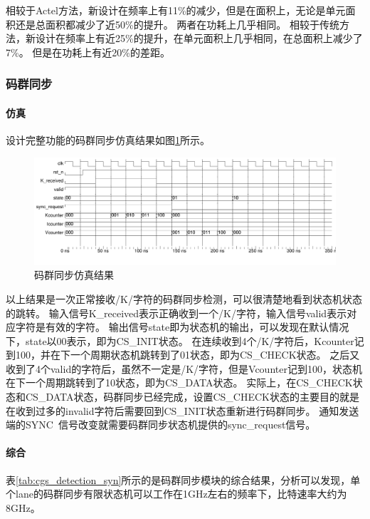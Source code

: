 \documentclass[UTF8]{ctexart}
\begin{document}
相较于Actel方法，新设计在频率上有11\%的减少，但是在面积上，无论是单元面积还是总面积都减少了近50\%的提升。
两者在功耗上几乎相同。
相较于传统方法，新设计在频率上有近25\%的提升，在单元面积上几乎相同，在总面积上减少了7\%。
但是在功耗上有近20\%的差距。

\subsubsection{码群同步}

\paragraph{仿真}

设计完整功能的码群同步仿真结果如图\ref{fig:cgs_detection_wave}所示。

\begin{figure}[H]
	\centering
	\includegraphics[width=18cm]{./img/cgs_detection_wave.pdf}
	\caption{码群同步仿真结果}
	\label{fig:cgs_detection_wave}
\end{figure}

以上结果是一次正常接收/K/字符的码群同步检测，可以很清楚地看到状态机状态的跳转。
输入信号K\_received表示正确收到一个/K/字符，输入信号valid表示对应字符是有效的字符。
输出信号state即为状态机的输出，可以发现在默认情况下，state以00表示，即为CS\_INIT状态。
在连续收到4个/K/字符后，Kcounter记到100，并在下一个周期状态机跳转到了01状态，即为CS\_CHECK状态。
之后又收到了4个valid的字符后，虽然不一定是/K/字符，但是Vcounter记到100，状态机在下一个周期跳转到了10状态，即为CS\_DATA状态。
实际上，在CS\_CHECK状态和CS\_DATA状态，码群同步已经完成，设置CS\_CHECK状态的主要目的就是在收到过多的invalid字符后需要回到CS\_INIT状态重新进行码群同步。
通知发送端的SYNC~信号改变就需要码群同步状态机提供的sync\_request信号。

\paragraph{综合}

表\ref{tab:cgs_detection_syn}所示的是码群同步模块的综合结果，分析可以发现，单个lane的码群同步有限状态机可以工作在1GHz左右的频率下，比特速率大约为8GHz。
\end{document}
